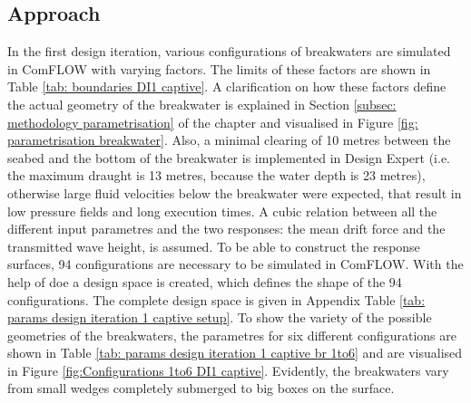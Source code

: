 \subsection{Approach}
\label{sec: DI1 captive H3 approach}

In the first design iteration, various configurations of breakwaters are simulated in ComFLOW with varying factors. The limits of these factors are shown in Table \ref{tab: boundaries DI1 captive}. A clarification on how these factors define the actual geometry of the breakwater is explained in Section \ref{subsec: methodology parametrisation} of the  chapter and visualised in Figure \ref{fig: parametrisation breakwater}. Also, a minimal clearing of 10 metres between the seabed and the bottom of the breakwater is implemented in Design Expert (i.e. the maximum draught is 13 metres, because the water depth is 23 metres), otherwise large fluid velocities below the breakwater were expected, that result in low pressure fields and long execution times. A cubic relation between all the different input parametres and the two responses: the mean drift force and the transmitted wave height, is assumed. To be able to construct the response surfaces, 94 configurations are necessary to be simulated in ComFLOW. With the help of \acrfull{doe} a design space is created, which defines the shape of the 94 configurations. The complete design space is given in Appendix Table \ref{tab: params design iteration 1 captive setup}. To show the variety of the possible geometries of the breakwaters, the parametres for six different configurations are shown in Table \ref{tab: params design iteration 1 captive br 1to6} and are visualised in Figure  \ref{fig:Configurations 1to6 DI1 captive}. Evidently, the breakwaters vary from small wedges completely submerged to big boxes on the surface. 

\begin{table}[h]
\centering
{}
\caption{Boundaries Design Space Captive Design Iteration 1}
\label{tab: boundaries DI1 captive}
\end{table}

